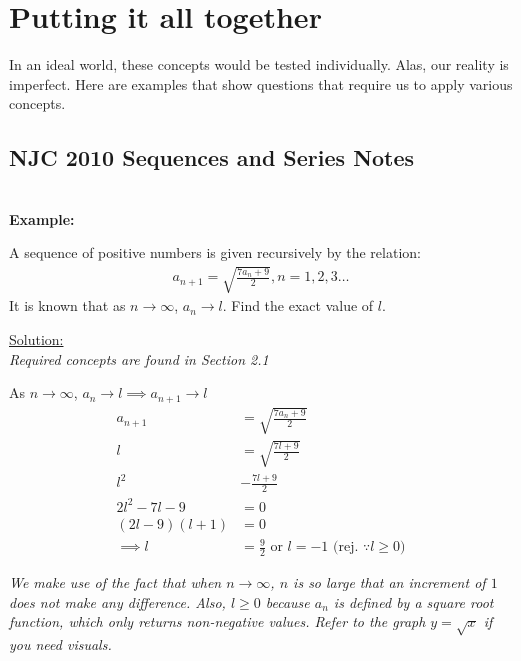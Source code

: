 \documentclass[12pt, a4paper, titlepage]{article}
\begin{document}
\section{Putting it all together}

In an ideal world, these concepts would be tested individually. Alas, our reality is imperfect. Here are examples that show questions that require us to apply various concepts.


\subsection{NJC 2010 Sequences and Series Notes}

\textbf{\\ Example:}

A sequence of positive numbers is given recursively by the relation:
\begin{align*}
    a_{n + 1} = \sqrt{\frac{7a_n + 9}{2}}, n = 1, 2, 3 \dots
\end{align*}
It is known that as $n \rightarrow \infty$, $a_n \rightarrow l$. Find the exact value of $l$.

\begin{flushright}
\end{flushright}

\underline{Solution:} \\
\emph{Required concepts are found in Section 2.1}

As $n \rightarrow \infty$, $a_n \rightarrow l \implies a_{n + 1} \rightarrow l$
\begin{align*}
    a_{n + 1} &= \sqrt{\frac{7a_n + 9}{2}} \\
    l &= \sqrt{\frac{7l + 9}{2}} \\
    l^2 &- \frac{7l + 9}{2} \\
    2l^2 - 7l - 9 &= 0 \\
    (2l - 9)(l + 1) &= 0 \\
    \implies l &= \frac{9}{2} \text{ or } l = -1 \text{ (rej. } \because l \ge 0 \text{)}
\end{align*}

\emph{We make use of the fact that when $n \rightarrow \infty$, $n$ is so large that an increment of $1$ does not make any difference. Also, $l \ge 0$ because $a_n$ is defined by a square root function, which only returns non-negative values. Refer to the graph $y = \sqrt{x}$ if you need visuals.}
\end{document}
